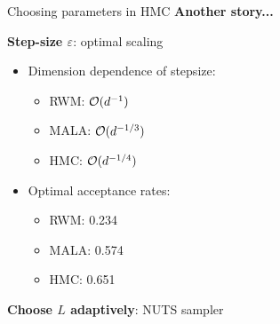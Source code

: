 \begin{frame}{Choosing parameters in HMC}
	\textbf{Another story...}
	\vspace{0.5cm}

	\textbf{Step-size $\varepsilon$}: optimal scaling

	\begin{itemize}
		\item Dimension dependence of stepsize:
		      \begin{itemize}
			      \item RWM: $\mathcal{O}(d^{-1})$
			      \item MALA: $\mathcal{O}(d^{-1/3})$
			      \item HMC: $\mathcal{O}(d^{-1/4})$
		      \end{itemize}
		\item Optimal acceptance rates:
		      \begin{itemize}
			      \item RWM: 0.234
			      \item MALA: 0.574
			      \item HMC: 0.651
		      \end{itemize}
	\end{itemize}
	\vspace{0.5cm}
	\textbf{Choose $L$ adaptively}: NUTS sampler
\end{frame}
